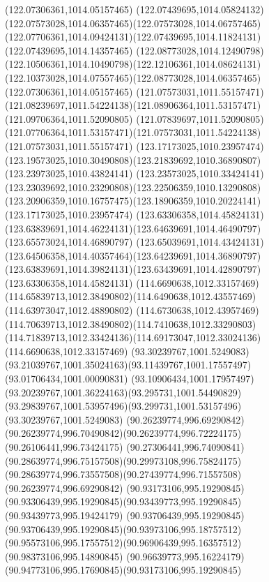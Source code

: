 {{		\moveto(122.07306361,1014.05157465)
		\curveto(122.07439695,1014.05824132)(122.07573028,1014.06357465)(122.07573028,1014.06757465)
		\curveto(122.07706361,1014.09424131)(122.07439695,1014.11824131)(122.07439695,1014.14357465)
		\curveto(122.08773028,1014.12490798)(122.10506361,1014.10490798)(122.12106361,1014.08624131)
		\curveto(122.10373028,1014.07557465)(122.08773028,1014.06357465)(122.07306361,1014.05157465)
		\moveto(121.07573031,1011.55157471)
		\curveto(121.08239697,1011.54224138)(121.08906364,1011.53157471)(121.09706364,1011.52090805)
		\lineto(121.07839697,1011.52090805)
		\curveto(121.07706364,1011.53157471)(121.07573031,1011.54224138)(121.07573031,1011.55157471)
		\moveto(123.17173025,1010.23957474)
		\curveto(123.19573025,1010.30490808)(123.21839692,1010.36890807)(123.23973025,1010.43824141)
		\curveto(123.23573025,1010.33424141)(123.23039692,1010.23290808)(123.22506359,1010.13290808)
		\curveto(123.20906359,1010.16757475)(123.18906359,1010.20224141)(123.17173025,1010.23957474)
		\moveto(123.63306358,1014.45824131)
		\curveto(123.63839691,1014.46224131)(123.64639691,1014.46490797)(123.65573024,1014.46890797)
		\curveto(123.65039691,1014.43424131)(123.64506358,1014.40357464)(123.64239691,1014.36890797)
		\curveto(123.63839691,1014.39824131)(123.63439691,1014.42890797)(123.63306358,1014.45824131)
		\moveto(114.6690638,1012.33157469)
		\curveto(114.65839713,1012.38490802)(114.6490638,1012.43557469)(114.63973047,1012.48890802)
		\curveto(114.6730638,1012.43957469)(114.70639713,1012.38490802)(114.7410638,1012.33290803)
		\curveto(114.71839713,1012.33424136)(114.69173047,1012.33024136)(114.6690638,1012.33157469)
		\moveto(93.30239767,1001.5249083)
		\curveto(93.21039767,1001.35024163)(93.11439767,1001.17557497)(93.01706434,1001.00090831)
		\curveto(93.10906434,1001.17957497)(93.20239767,1001.36224163)(93.295731,1001.54490829)
		\curveto(93.29839767,1001.53957496)(93.299731,1001.53157496)(93.30239767,1001.5249083)
		\moveto(90.26239774,996.69290842)
		\curveto(90.26239774,996.70490842)(90.26239774,996.72224175)(90.26106441,996.73424175)
		\curveto(90.27306441,996.74090841)(90.28639774,996.75157508)(90.29973108,996.75824175)
		\curveto(90.28639774,996.73557508)(90.27439774,996.71557508)(90.26239774,996.69290842)
		\moveto(90.93173106,995.19290845)
		\curveto(90.93306439,995.19290845)(90.93439773,995.19290845)(90.93439773,995.19424179)
		\curveto(90.93706439,995.19290845)(90.93706439,995.19290845)(90.93973106,995.18757512)
		\curveto(90.95573106,995.17557512)(90.96906439,995.16357512)(90.98373106,995.14890845)
		\curveto(90.96639773,995.16224179)(90.94773106,995.17690845)(90.93173106,995.19290845)
}}
